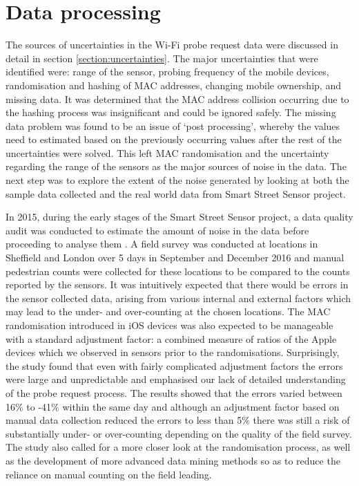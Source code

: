 \section{Data processing} \label{section:processing}

The sources of uncertainties in the Wi-Fi probe request data were discussed in detail in section \ref{section:uncertainties}.
The major uncertainties that were identified were: range of the sensor, probing frequency of the mobile devices, randomisation and hashing of MAC addresses, changing mobile ownership, and missing data.
It was determined that the MAC address collision occurring due to the hashing process was insignificant and could be ignored safely.
The missing data problem was found to be an issue of `post processing', whereby the values need to estimated based on the previously occurring values after the rest of the uncertainties were solved.
This left MAC randomisation and the uncertainty regarding the range of the sensors as the major sources of noise in the data.
The next step was to explore the extent of the noise generated by looking at both the sample data collected and the real world data from Smart Street Sensor project.

In 2015, during the early stages of the Smart Street Sensor project, a data quality audit was conducted to estimate the amount of noise in the data before proceeding to analyse them \cite{lugomer2017}.
A field survey was conducted at locations in Sheffield and London over 5 days in September and December 2016 and manual pedestrian counts were collected for these locations to be compared to the counts reported by the sensors.
It was intuitively expected that there would be errors in the sensor collected data, arising from various internal and external factors which may lead to the under- and over-counting at the chosen locations.
The MAC randomisation introduced in iOS devices was also expected to be manageable with a standard adjustment factor: a combined measure of ratios of the Apple devices which we observed in sensors prior to the randomisations.
Surprisingly, the study found that even with fairly complicated adjustment factors the errors were large and unpredictable and emphasised our lack of detailed understanding of the probe request process.
The results showed that the errors varied between 16\% to -41\% within the same day and although an adjustment factor based on manual data collection reduced the errors to less than 5\% there was still a risk of substantially under- or over-counting depending on the quality of the field survey.
The study also called for a more closer look at the randomisation process, as well as the development of more advanced data mining methods so as to reduce the reliance on manual counting on the field leading. 

